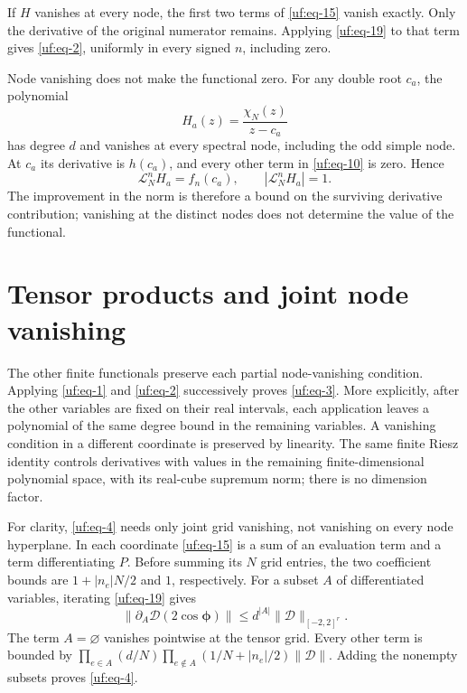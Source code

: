 \documentclass[11pt]{article}
\numberwithin{equation}{section}
\theoremstyle{definition}\newtheorem{definition}[theorem]{Definition}
\theoremstyle{remark}\newtheorem{remark}[theorem]{Remark}
\begin{document}
If \(H\) vanishes at every node, the first two terms of \eqref{uf:eq-15} vanish
exactly. Only the derivative of the original numerator remains. Applying
\eqref{uf:eq-19} to that term gives \eqref{uf:eq-2}, uniformly in every signed \(n\), including
zero.

Node vanishing does not make the functional zero. For any double
root $c_a$, the polynomial
\[
 H_a(z)=\frac{\chi_N(z)}{z-c_a}
\]
has degree $d$ and vanishes at every spectral node, including the odd
simple node. At $c_a$ its derivative is $h(c_a)$, and every other
term in \eqref{uf:eq-10} is zero. Hence
\begin{equation}\label{fb:nonzero-normal-example}
 \mathcal L_N^nH_a=f_n(c_a),\qquad
 |\mathcal L_N^nH_a|=1.
\end{equation}
The improvement in the norm is therefore a bound on the surviving
derivative contribution; vanishing at the distinct nodes does not determine
the value of the functional.

\section{Tensor products and joint node vanishing}\label{uf:sec-shared-polynomials-and-the-unsplit-complementary-source}

The other finite functionals preserve each partial node-vanishing
condition. Applying \eqref{uf:eq-1} and \eqref{uf:eq-2} successively proves
\eqref{uf:eq-3}. More explicitly, after the other variables are fixed
on their real intervals, each application leaves a polynomial of the
same degree bound in the remaining variables. A vanishing condition
in a different coordinate is preserved by linearity. The same finite
Riesz identity controls derivatives with values in the remaining
finite-dimensional polynomial space, with its real-cube supremum norm;
there is no dimension factor.

For clarity, \eqref{uf:eq-4} needs only joint grid vanishing, not vanishing on every
node hyperplane. In each coordinate \eqref{uf:eq-15} is a sum of an evaluation term
and a term differentiating \(P\). Before summing its \(N\) grid entries,
the two coefficient bounds are \(1+|n_e|N/2\) and \(1\), respectively.
For a subset \(A\) of differentiated variables, iterating \eqref{uf:eq-19} gives \begin{equation}\label{uf:eq-24}
\|\partial_A\mathcal D(2\cos\boldsymbol\phi)\|
                  \le d^{|A|}\|\mathcal D\|_{[-2,2]^r}.
\end{equation} The term \(A=\varnothing\) vanishes pointwise at the tensor grid.
Every other term is bounded by
\(\prod_{e\in A}(d/N)\prod_{e\notin A}(1/N+|n_e|/2)\|\mathcal D\|\).
Adding the nonempty subsets proves \eqref{uf:eq-4}.
\end{document}
